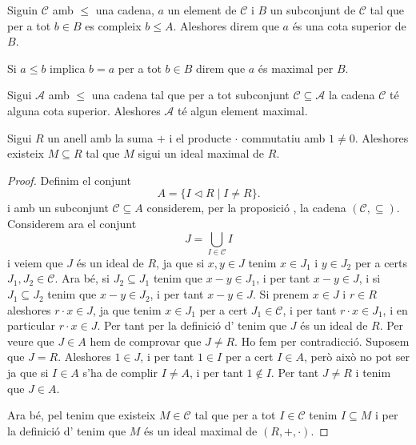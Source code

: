\documentclass[../Apunts.tex]{subfiles}
\begin{document}
	\begin{definition}
		\label{def:cota superior d'una cadena}
		\label{def:element maximal d'una cadena}
		Siguin \(\mathcal{C}\) amb \(\leq\) una cadena, \(a\) un element de \(\mathcal{C}\) i \({B}\) un subconjunt de \(\mathcal{C}\) tal que per a tot \(b\in{B}\) es compleix \(b\leq A\). Aleshores direm que \(a\) és una cota superior de \({B}\).
		
		Si \(a\leq b\) implica \(b=a\) per a tot \(b\in{B}\) direm que \(a\) és maximal per \({B}\).
	\end{definition}
	\begin{axiom}
		\label{lema de Zorn}
		Sigui \(\mathcal{A}\) amb \(\leq\) una cadena tal que per a tot subconjunt \(\mathcal{C}\subseteq\mathcal{A}\) la cadena \(\mathcal{C}\) té alguna cota superior. Aleshores \(\mathcal{A}\) té algun element maximal.
	\end{axiom}
	\begin{theorem}
		\label{thm:ideal maximal exsiteix}
		Sigui \(R\) un anell amb la suma \(+\) i el producte \(\cdot\) commutatiu amb \(1\neq0\). Aleshores existeix \(M\subseteq R\) tal que \(M\) sigui un ideal maximal de \(R\).
		\begin{proof}
			Definim el conjunt
			\[A=\{I\triangleleft R\mid I\neq R\}.\]
			i amb un subconjunt \(\mathcal{C}\subseteq A\) considerem, per la proposició , la cadena \((\mathcal{C},\subseteq)\). Considerem ara el conjunt
			\[J=\bigcup_{I\in\mathcal{C}}I\]
			i veiem que \(J\) és un ideal de \(R\), ja que si \(x,y\in J\) tenim \(x\in J_{1}\) i \(y\in J_{2}\) per a certs \(J_{1},J_{2}\in\mathcal{C}\). Ara bé, si \(J_{2}\subseteq J_{1}\) tenim que \(x-y\in J_{1}\), i per tant \(x-y\in J\), i si \(J_{1}\subseteq J_{2}\) tenim que \(x-y\in J_{2}\), i per tant \(x-y\in J\). Si prenem \(x\in J\) i \(r\in R\) aleshores \(r\cdot x\in J\), ja que tenim \(x\in J_{1}\) per a cert \(J_{1}\in\mathcal{C}\), i per tant \(r\cdot x\in J_{1}\), i en particular \(r\cdot x\in J\). Per tant per la definició d' tenim que \(J\) és un ideal de \(R\). Per veure que \(J\in A\) hem de comprovar que \(J\neq R\). Ho fem per contradicció. Suposem que \(J=R\). Aleshores \(1\in J\), i per tant \(1\in I\) per a cert \(I\in A\), però això no pot ser ja que si \(I\in A\) s'ha de complir \(I\neq A\), i per tant \(1\notin I\). Per tant \(J\neq R\) i tenim que \(J\in A\).
			
			Ara bé, pel  tenim que existeix \(M\in\mathcal{C}\) tal que per a tot \(I\in\mathcal{C}\) tenim \(I\subseteq M\) i per la definició d' tenim que \(M\) és un ideal maximal de \((R,+,\cdot)\).
		\end{proof}
	\end{theorem}
\end{document}
